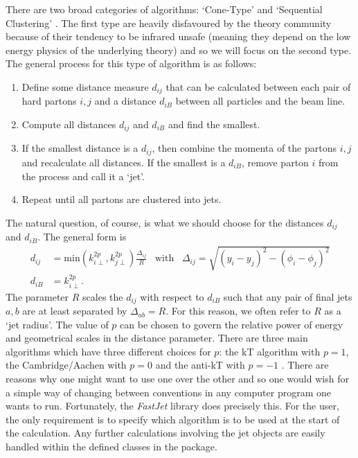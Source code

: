 There are two broad categories of algorithms: `Cone-Type' and `Sequential Clustering' \cite{Atkin2015}. The first type are heavily disfavoured by the theory community because of their tendency to be infrared unsafe (meaning they depend on the low energy physics of the underlying theory) and so we will focus on the second type. The general process for this type of algorithm is as follows:

\begin{enumerate}
\item{Define some distance measure $d_{ij}$ that can be calculated between each pair of hard partons $i,j$ and a distance $d_{iB}$ between all particles and the beam line.}
\item{Compute all distances $d_{ij}$ and $d_{iB}$ and find the smallest.}
\item{If the smallest distance is a $d_{ij}$, then combine the momenta of the partons $i, j$ and recalculate all distances. If the smallest is a $d_{iB}$, remove parton $i$ from the process and call it a `jet'.}
\item{Repeat until all partons are clustered into jets.}
\end{enumerate}

The natural question, of course, is what we should choose for the distances $d_{ij}$ and $d_{iB}$. The general form is
\begin{equation}
\begin{split}
d_{ij} &= \text{min}\left(k_{i \perp}^{2p},k_{j \perp}^{2p} \right) \frac{\Delta_{ij}}{R} \hspace{10pt} \text{with} \hspace{10pt} \Delta_{ij} = \sqrt{(y_i - y_j)^2 - (\phi_i - \phi_j)^2} \\
d_{iB} &= k_{i \perp}^{2p}.
\end{split}
\end{equation}
The parameter $R$ scales the $d_{ij}$ with respect to $d_{iB}$ such that any pair of final jets $a, b$ are at least separated by $\Delta_{ab} = R$. For this reason, we often refer to $R$ as a `jet radius'. The value of $p$ can be chosen to govern the relative power of energy and geometrical scales in the distance parameter. There are three main algorithms which have three different choices for $p$: the kT algorithm with $p =1$, the Cambridge/Aachen with $p=0$ and the anti-kT with $p = -1$ \cite{Atkin2015}. There are reasons why one might want to use one over the other and so one would wish for a simple way of changing between conventions in any computer program one wants to run. Fortunately, the \emph{FastJet} library \cite{Cacciari2012} does precisely this. For the user, the only requirement is to specify which algorithm is to be used at the start of the calculation. Any further calculations involving the jet objects are easily handled within the defined classes in the package. 

